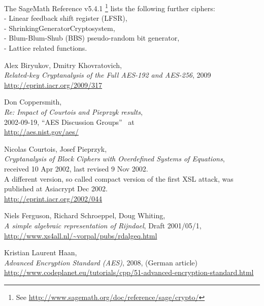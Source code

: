 The SageMath Reference v5.4.1%
\footnote{
See \url{http://www.sagemath.org/doc/reference/sage/crypto/}
}
lists the following further ciphers:\\ 
- Linear feedback shift register (LFSR),\\
- ShrinkingGeneratorCryptosystem,\\
- Blum-Blum-Shub (BBS) pseudo-random bit generator,\\
- Lattice related functions.




\newpage
\begin{thebibliography}{99999}

 
	Alex Biryukov, Dmitry Khovratovich, \\
	{\em Related-key Cryptanalysis of the Full AES-192 and AES-256},
	2009 \\
	\url{http://eprint.iacr.org/2009/317}

  
        Don Coppersmith, \\
        {\em Re: Impact of Courtois and Pieprzyk results}, \\
        2002-09-19, ``AES Discussion Groups''~ at \\
        \url{http://aes.nist.gov/aes/}

  
        Nicolas Courtois, Josef Pieprzyk, \\
        {\em Cryptanalysis of Block Ciphers with Overdefined Systems
             of Equations}, \\
        received 10 Apr 2002, last revised 9 Nov 2002.\\
        A different version, so called compact version of the first XSL attack,
        was published at Asiacrypt Dec 2002. \\
        \url{http://eprint.iacr.org/2002/044}

  
       Niels Ferguson, Richard Schroeppel, Doug Whiting, \\
       {\em A simple algebraic representation of Rijndael}, 
       Draft 2001/05/1, \\
       \url{http://www.xs4all.nl/~vorpal/pubs/rdalgeq.html}

  
       Kristian Laurent Haan, \\
       {\em Advanced Encryption Standard (AES)},
       2008, (German article)\\
       \url{http://www.codeplanet.eu/tutorials/cpp/51-advanced-encryption-standard.html}


\end{thebibliography}
